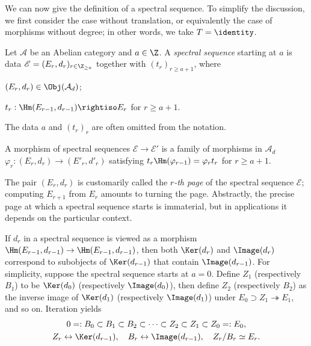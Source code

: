 We can now give the definition of a spectral sequence. To simplify the
discussion, we first consider the case without translation, or equivalently
the case of morphisms without degree; in other words, we take
$T=\identity$.

\begin{definition}\label{def:SS-abstract}
	Let $\mathcal{A}$ be an Abelian category and $a\in\Z$. A
	\emph{spectral sequence} starting at $a$ is data
	$\mathscr{E}=(E_r,d_r)_{r\in\Z_{\geq a}}$ together with
	$(t_r)_{r\geq a+1}$, where
	\begin{compactitem}
		\item $(E_r,d_r)\in\Obj(\mathcal{A}_d)$;
		\item $t_r:\Hm(E_{r-1},d_{r-1})\rightiso E_r$ for $r\geq a+1$.
	\end{compactitem}
	The data $a$ and $(t_r)_r$ are often omitted from the notation.

	A morphism of spectral sequences $\mathscr{E}\to\mathscr{E}'$ is a family
	of morphisms in $\mathcal{A}_d$
	$\varphi_r:(E_r,d_r)\to(E'_r,d'_r)$ satisfying
	$t_r\Hm(\varphi_{r-1})=\varphi_rt_r$ for $r\geq a+1$.
\end{definition}

The pair $(E_r,d_r)$ is customarily called the \emph{$r$-th page} of the
spectral sequence $\mathscr{E}$; computing $E_{r+1}$ from $E_r$ amounts to
turning the page. Abstractly, the precise page at which a spectral sequence
starts is immaterial, but in applications it depends on the particular
context.

If $d_r$ in a spectral sequence is viewed as a morphism
$\Hm(E_{r-1},d_{r-1})\to\Hm(E_{r-1},d_{r-1})$, then both
$\Ker(d_r)$ and $\Image(d_r)$ correspond to subobjects of
$\Ker(d_{r-1})$ that contain $\Image(d_{r-1})$. For simplicity, suppose the
spectral sequence starts at $a=0$. Define $Z_1$ (respectively $B_1$) to be
$\Ker(d_0)$ (respectively $\Image(d_0)$), then define $Z_2$ (respectively
$B_2$) as the inverse image of $\Ker(d_1)$ (respectively $\Image(d_1)$) under
$E_0\supset Z_1\twoheadrightarrow E_1$, and so on. Iteration yields
\begin{equation}\label{eqn:spectral-sequence-Z-B}\begin{gathered}
	0=:B_0\subset B_1\subset B_2\subset\cdots\subset Z_2\subset Z_1
	\subset Z_0=:E_0, \\
	Z_r\leftrightarrow\Ker(d_{r-1}),\quad
	B_r\leftrightarrow\Image(d_{r-1}),\quad Z_r/B_r\simeq E_r.
\end{gathered}\end{equation}


